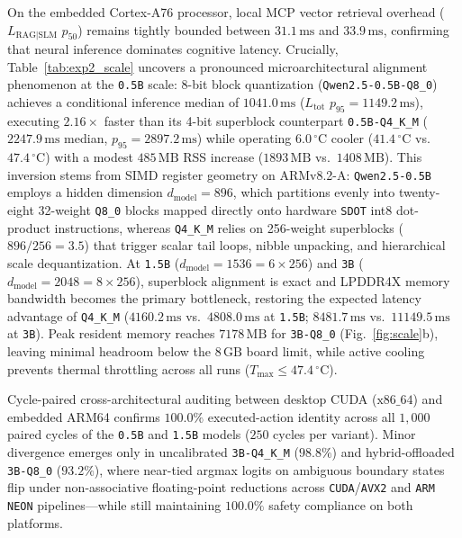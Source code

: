 \documentclass{ieeeaccess}
\begin{document}
On the embedded Cortex-A76 processor, local MCP vector retrieval overhead ($L_{\mathrm{RAG}|\mathrm{SLM}}$ $p_{50}$) remains tightly bounded between $31.1\,\text{ms}$ and $33.9\,\text{ms}$, confirming that neural inference dominates cognitive latency. Crucially, Table~\ref{tab:exp2_scale} uncovers a pronounced microarchitectural alignment phenomenon at the \texttt{0.5B} scale: 8-bit block quantization (\texttt{Qwen2.5-0.5B-Q8\_0}) achieves a conditional inference median of $1041.0\,\text{ms}$ ($L_{\mathrm{tot}}$ $p_{95} = 1149.2\,\text{ms}$), executing $2.16\times$ faster than its 4-bit superblock counterpart \texttt{0.5B-Q4\_K\_M} ($2247.9\,\text{ms}$ median, $p_{95} = 2897.2\,\text{ms}$) while operating $6.0\,^\circ\text{C}$ cooler ($41.4\,^\circ\text{C}$ vs.\ $47.4\,^\circ\text{C}$) with a modest $485\,\text{MB}$ RSS increase ($1893\,\text{MB}$ vs.\ $1408\,\text{MB}$). This inversion stems from SIMD register geometry on ARMv8.2-A: \texttt{Qwen2.5-0.5B} employs a hidden dimension $d_{\mathrm{model}} = 896$, which partitions evenly into twenty-eight 32-weight \texttt{Q8\_0} blocks mapped directly onto hardware \texttt{SDOT} int8 dot-product instructions, whereas \texttt{Q4\_K\_M} relies on 256-weight superblocks ($896 / 256 = 3.5$) that trigger scalar tail loops, nibble unpacking, and hierarchical scale dequantization. At \texttt{1.5B} ($d_{\mathrm{model}} = 1536 = 6 \times 256$) and \texttt{3B} ($d_{\mathrm{model}} = 2048 = 8 \times 256$), superblock alignment is exact and LPDDR4X memory bandwidth becomes the primary bottleneck, restoring the expected latency advantage of \texttt{Q4\_K\_M} ($4160.2\,\text{ms}$ vs.\ $4808.0\,\text{ms}$ at \texttt{1.5B}; $8481.7\,\text{ms}$ vs.\ $11149.5\,\text{ms}$ at \texttt{3B}). Peak resident memory reaches $7178\,\text{MB}$ for \texttt{3B-Q8\_0} (Fig.~\ref{fig:scale}b), leaving minimal headroom below the $8\,\text{GB}$ board limit, while active cooling prevents thermal throttling across all runs ($T_{\max} \le 47.4\,^\circ\text{C}$).

Cycle-paired cross-architectural auditing between desktop CUDA ($\text{x86\_64}$) and embedded ARM64 confirms $100.0\%$ executed-action identity across all $1{,}000$ paired cycles of the \texttt{0.5B} and \texttt{1.5B} models ($250$ cycles per variant). Minor divergence emerges only in uncalibrated \texttt{3B-Q4\_K\_M} ($98.8\%$) and hybrid-offloaded \texttt{3B-Q8\_0} ($93.2\%$), where near-tied argmax logits on ambiguous boundary states flip under non-associative floating-point reductions across \texttt{CUDA}/\texttt{AVX2} and \texttt{ARM NEON} pipelines—while still maintaining $100.0\%$ safety compliance on both platforms.
\end{document}
